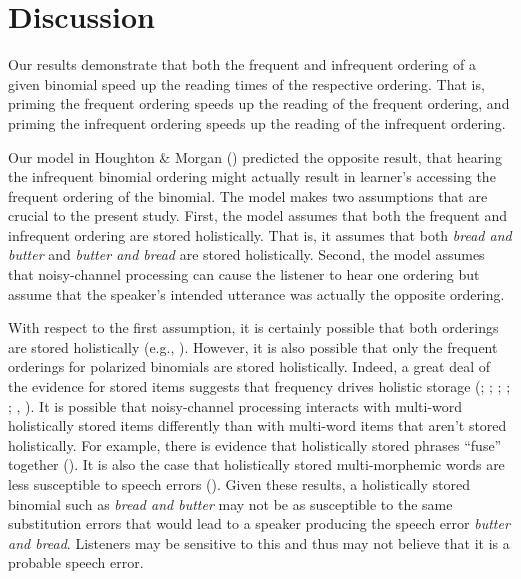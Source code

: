 \documentclass[
  12pt,
]{scrartcl}
\begin{document}
\section{Discussion}\label{discussion}

Our results demonstrate that both the frequent and infrequent ordering
of a given binomial speed up the reading times of the respective
ordering. That is, priming the frequent ordering speeds up the reading
of the frequent ordering, and priming the infrequent ordering speeds up
the reading of the infrequent ordering.

Our model in Houghton \& Morgan
()
predicted the opposite result, that hearing the infrequent binomial
ordering might actually result in learner's accessing the frequent
ordering of the binomial. The model makes two assumptions that are
crucial to the present study. First, the model assumes that both the
frequent and infrequent ordering are stored holistically. That is, it
assumes that both \emph{bread and butter} and \emph{butter and bread}
are stored holistically. Second, the model assumes that noisy-channel
processing can cause the listener to hear one ordering but assume that
the speaker's intended utterance was actually the opposite ordering.

With respect to the first assumption, it is certainly possible that both
orderings are stored holistically (e.g.,
).
However, it is also possible that only the frequent orderings for
polarized binomials are stored holistically. Indeed, a great deal of the
evidence for stored items suggests that frequency drives holistic
storage (; ;
;
;
; , ).
It is possible that noisy-channel processing interacts with multi-word
holistically stored items differently than with multi-word items that
aren't stored holistically. For example, there is evidence that
holistically stored phrases ``fuse'' together
(). It is also the case that holistically stored
multi-morphemic words are less susceptible to speech errors
(). Given these results, a holistically stored binomial
such as \emph{bread and butter} may not be as susceptible to the same
substitution errors that would lead to a speaker producing the speech
error \emph{butter and bread}. Listeners may be sensitive to this and
thus may not believe that it is a probable speech error.
\end{document}
